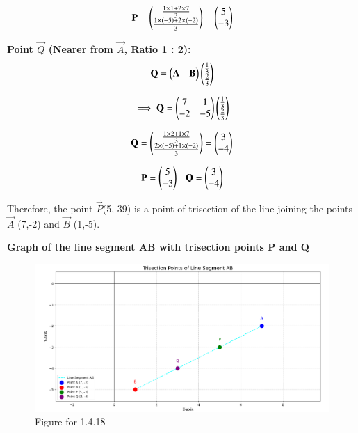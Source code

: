\documentclass[journal]{IEEEtran}
\begin{document}
\begin{align}
\vec{P} = \begin{myvec}{
\frac{1 \times 1 + 2 \times 7}{3} \\
\frac{1 \times (-5) + 2 \times (-2)}{3}
}\end{myvec}
= \begin{myvec}{ 5 \\ - 3 }\end{myvec}
\end{align}

\textbf{Point \( \vec{Q} \) (Nearer from \( \vec{A} \), Ratio 1 : 2):}
\begin{align}   
\vec{Q} = \begin{myvec}{\vec{A}& \vec{B}}\end{myvec}\begin{myvec}
        {\frac{1}{3}\\\frac{2}{3}}\end{myvec}    
\end{align}       

\begin{align}
\implies \vec{Q}=\begin{myvec}{ 7 & 1\\ -2 & -5 }\end{myvec}\begin{myvec}
        {\frac{1}{3}\\\frac{2}{3}}\end{myvec}\\
\end{align}


\begin{align}
\vec{Q} = \begin{myvec}{
\frac{1 \times 2 + 1 \times 7}{3} \\
\frac{2 \times (-5) + 1 \times (-2)}{3}
}\end{myvec}= \begin{myvec}{ 3 \\ -4 }\end{myvec}
\end{align}

    
\begin{align}
\mathbf{P} = \begin{pmatrix}5\\-3\end{pmatrix}\ \ \  \mathbf{Q} = \begin{pmatrix}3\\-4\end{pmatrix}
\end{align}

Therefore, the point $\vec{P}$(5,-39) is a point of trisection of the line joining the points $\vec{A}$ (7,-2) and  $\vec{B}$ (1,-5).

\vspace{5em}
\textbf{Graph of the line segment AB with trisection points P and Q}
\begin{figure}[H]
    \centering
    \includegraphics[width=1.1\columnwidth]{figs/fig1.png}
    \caption{Figure for 1.4.18}
    \label{fig1}
\end{figure}
\end{document}
